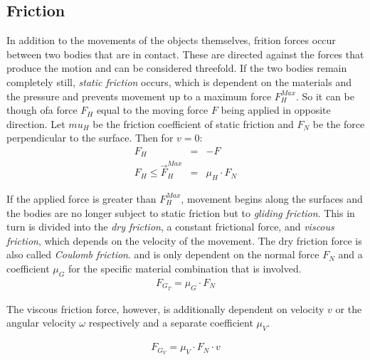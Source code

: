\documentclass[10pt,a4paper]{article}
\begin{document}
\subsection{Friction}

In addition to the movements of the objects themselves, frition forces occur between two bodies that
are in contact. These are directed against the forces that produce the motion and can be considered
threefold.  If the two bodies remain completely still, \textit{static friction} occurs, which is
dependent on the materials and the pressure and prevents movement up to a maximum force $F_H^{Max}$.
So it can be though ofa force $F_H$ equal to the moving force $F$ being applied in opposite
direction.  Let $mu_H$ be the friction coefficient of static friction and $F_N$ be the force
perpendicular to the surface. Then for $v = 0$:
\begin{eqnarray}
    F_H & = & -F \\
    F_H \le \vec F_H^{Max} & = & \mu_H \cdot F_N
\end{eqnarray}

If the applied force is greater than $F_H^{Max}$, movement begins along the surfaces and the bodies
are no longer subject to static friction but to \textit{gliding friction}.
This in turn is divided into the \textit {dry friction}, a constant frictional force,
and \textit{viscous friction}, which depends on the velocity of the movement.
The dry friction force is also called \textit{Coulomb friction}.
and is only dependent on the normal force $F_N$ and a coefficient $\mu_G$ for the
specific material combination that is involved.
\begin{eqnarray}
    F_{G_T} = \mu_G \cdot F_N
\end{eqnarray}

The viscous friction force, however, is additionally dependent on velocity $v$ or the
angular velocity $\omega$ respectively and a separate coefficient $\mu_V$.

\begin{eqnarray}
    F_{G_V} = \mu_V \cdot F_N \cdot v
\end{eqnarray}
\end{document}
